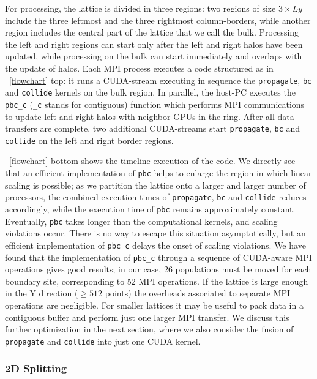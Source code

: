 \documentclass{elsarticle}
\begin{document}
For processing, the lattice is divided in three regions: two regions of 
size $3\times Ly$ include the three leftmost and the three rightmost column-borders, 
while another region includes the central part of the lattice that we call the bulk. 
%
Processing the left and right regions can start only after the left 
and right halos have been updated, while processing on the bulk can start 
immediately and overlaps with the update of halos.
%
Each MPI process executes a code structured as in \figurename~\ref{flowchart} top: 
it runs a CUDA-stream executing in sequence the {\tt propagate}, {\tt bc} 
and {\tt collide} kernels on the bulk region. 
%
In parallel, the host-PC executes the {\tt pbc\_c} ({\tt \_c} stands for contiguous) 
function which performs MPI communications to update left and right halos with 
neighbor GPUs in the ring. 
After all data transfers are complete, two additional CUDA-streams 
start {\tt propagate}, {\tt bc} and {\tt collide} 
on the left and right border regions.

\figurename~\ref{flowchart} bottom shows the timeline execution 
of the code.
%
We directly see that an efficient implementation of {\tt pbc} helps to 
enlarge the region in which linear scaling is possible; as we partition the lattice 
onto a larger and larger number of processors, the combined execution times 
of {\tt propagate}, {\tt bc} and {\tt collide} 
reduces accordingly, while the execution time of {\tt pbc} remains 
approximately constant. 
%
Eventually, {\tt pbc} takes longer than the 
computational kernels, and scaling violations occur. 
%
There is no way to escape this situation asymptotically, but an efficient 
implementation of {\tt pbc\_c} delays the onset of scaling violations.
%
We have found that the implementation of {\tt pbc\_c} through 
a sequence of CUDA-aware MPI operations gives good results; in our case,
26 populations must be moved for each boundary site,
corresponding to 52 MPI operations.
%
If the lattice is large enough in the Y direction ($\ge 512$ points)
the overheads associated to separate MPI operations are negligible. For 
smaller lattices it may be useful to 
pack data in a contiguous buffer and perform just one larger MPI transfer. 
%
We discuss this further optimization in the next section, where we also consider
the fusion of {\tt propagate} and 
{\tt collide} into just one CUDA kernel.

\subsubsection*{2D Splitting}
\end{document}
